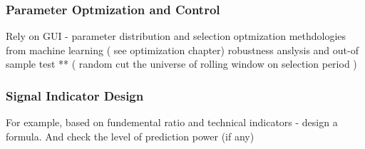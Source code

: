 \documentclass[11pt, openany]{book}              %
\begin{document}
\subsubsection{Parameter Optmization and Control}

Rely on GUI - parameter distribution and selection
optmization methdologies from machine learning ( see optimization chapter)
robustness anslysis and out-of sample test ** ( random cut the universe of rolling window on selection period )

\subsubsection{Signal Indicator Design}

For example, based on fundemental ratio and technical indicators - design a formula. And check the level of prediction power (if any)
\end{document}
